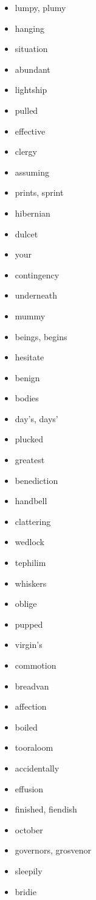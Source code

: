 \documentclass{article}
\begin{document}
\begin{itemize}
    \item lumpy, plumy
    \item hanging
    \item situation
    \item abundant
    \item lightship
    \item pulled
    \item effective
    \item clergy
    \item assuming
    \item prints, sprint
    \item hibernian
    \item dulcet
    \item your
    \item contingency
    \item underneath
    \item mummy
    \item beings, begins
    \item hesitate
    \item benign
    \item bodies
    \item day's, days'
    \item plucked
    \item greatest
    \item benediction
    \item handbell
    \item clattering
    \item wedlock
    \item tephilim
    \item whiskers
    \item oblige
    \item pupped
    \item virgin's
    \item commotion
    \item breadvan
    \item affection
    \item boiled
    \item tooraloom
    \item accidentally
    \item effusion
    \item finished, fiendish
    \item october
    \item governors, grosvenor
    \item sleepily
    \item bridie

\end{itemize}
\end{document}
